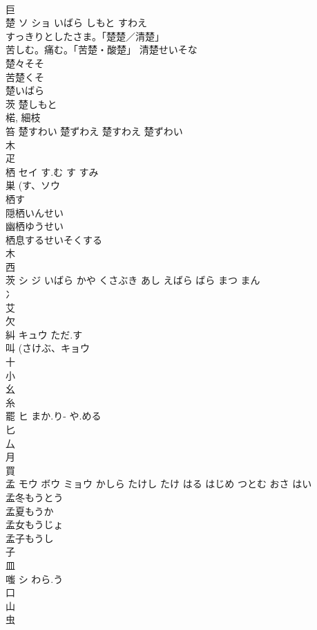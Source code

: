 \documentclass[8pt]{extreport}
\begin{document}
\begin{CJK}{UTF8}{min}
\\	巨 
\\	楚	ソ ショ	いばら しもと すわえ	
\\	すっきりとしたさま。「楚楚／清楚」 
\\	苦しむ。痛む。「苦楚・酸楚」		清楚せいそな 
\\	楚々そそ 
\\	苦楚くそ 
\\	楚いばら 
\\	茨 楚しもと 
\\	楉, 細枝 
\\	笞 楚すわい 楚ずわえ 楚すわえ 楚ずわい 
\\	木 
\\	疋 
\\	栖	セイ	す.む す すみ	
\\	巣 (す、ソウ 
\\	栖す
\\	隠栖いんせい
\\	幽栖ゆうせい
\\	栖息するせいそくする
\\	木 
\\	西 
\\	茨	シ ジ	いばら かや くさぶき あし えばら ばら まつ まん	
\\	冫 
\\	艾 
\\	欠 
\\	糾	キュウ	ただ.す	
\\	叫 (さけぶ、キョウ 
\\	十 
\\	小 
\\	幺 
\\	糸 
\\	罷	ヒ	まか.り- や.める	
\\	匕 
\\	厶 
\\	月 
\\	買 
\\	孟	モウ ボウ ミョウ	かしら たけし たけ はる はじめ つとむ おさ はい	
\\	孟冬もうとう
\\	孟夏もうか
\\	孟女もうじょ
\\	孟子もうし
\\	子 
\\	皿 
\\	嗤	シ	わら.う	
\\	口 
\\	山 
\\	虫 

\end{CJK}
\end{document}
